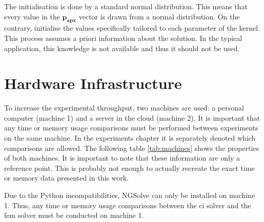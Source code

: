\documentclass[./\jobname.tex]{subfiles}
\begin{document}
The initialisation is done by a standard normal distribution. This means that every value in the $\mathbf{p_{apx}}$ vector is drawn from a normal distribution. On the contrary, \cite{chaquet_using_2019} initialise the values specifically tailored to each parameter of the kernel. This process assumes a priori information about the solution. In the typical application, this knowledge is not available and thus it should not be used. 


\section{Hardware Infrastructure}
\label{chap:hardware_setup}

To increase the experimental throughput, two machines are used: a personal computer (machine 1) and a server in the cloud (machine 2). It is important that any time or memory usage comparisons must be performed between experiments on the same machine. In the experiments chapter it is separately denoted which comparisons are allowed. The following table \ref{tab:machines} shows the properties of both machines. It is important to note that these information are only a reference point. This is probably not enough to actually recreate the exact time or memory data presented in this work. 

\begin{table}[h]
	\centering
	\noindent{}
	\label{tab:machines}
\end{table}

Due to the Python incompatibilities, NGSolve can only be installed on machine 1. Thus, any time or memory usage comparisons between the \gls{ci} solver and the \gls{fem} solver must be conducted on machine 1. 
\end{document}

